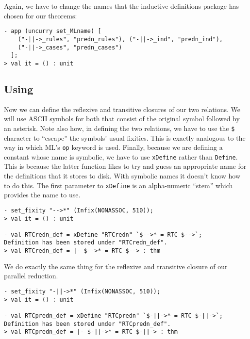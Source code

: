     Again, we have to change the names that the inductive definitions
    package has chosen for our theorems:
\begin{session}
\begin{verbatim}
- app (uncurry set_MLname) [
    ("-||->_rules", "predn_rules"), ("-||->_ind", "predn_ind"),
    ("-||->_cases", "predn_cases")
  ];
> val it = () : unit
\end{verbatim}
\end{session}

\subsection{Using }
\label{sec:Using-RTC}

Now we can define the reflexive and transitive closures of our two
relations.  We will use ASCII symbols for both that consist of the
original symbol followed by an asterisk.  Note also how, in
defining the two relations, we have to use the \texttt{\$} character
to ``escape'' the symbols' usual fixities.  This is exactly analogous
to the way in which ML's \texttt{op} keyword is used.  Finally,
because we are defining a constant whose name is symbolic, we have to
use \texttt{xDefine} rather than \texttt{Define}.  This is because the
latter function likes to try and guess an appropriate name for the
definitions that it stores to disk.  With symbolic names it doesn't
know how to do this.  The first parameter to \texttt{xDefine} is an
alpha-numeric ``stem'' which provides the name to use.
\begin{session}
\begin{verbatim}
- set_fixity "-->*" (Infix(NONASSOC, 510));
> val it = () : unit

- val RTCredn_def = xDefine "RTCredn" `$-->* = RTC $-->`;
Definition has been stored under "RTCredn_def".
> val RTCredn_def = |- $-->* = RTC $--> : thm
\end{verbatim}
\end{session}
We do exactly the same thing for the reflexive and transitive closure
of our parallel reduction.
\begin{session}
\begin{verbatim}
- set_fixity "-||->*" (Infix(NONASSOC, 510));
> val it = () : unit

- val RTCpredn_def = xDefine "RTCpredn" `$-||->* = RTC $-||->`;
Definition has been stored under "RTCpredn_def".
> val RTCpredn_def = |- $-||->* = RTC $-||-> : thm
\end{verbatim}
\end{session}
